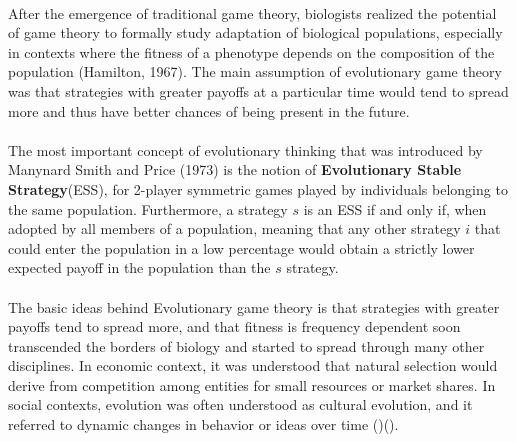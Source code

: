 \paragraph{}After the emergence of traditional game theory, biologists realized the potential of game theory to formally study adaptation of biological populations, especially in contexts where the fitness of a phenotype depends on the composition of the population (Hamilton, 1967). The main assumption of evolutionary game theory was that strategies with greater payoffs at a particular time would tend to spread more and thus have better chances of being present in the future.
\paragraph{}The most important concept of evolutionary thinking that was introduced by Manynard Smith and Price (1973) is the notion of \textbf{Evolutionary Stable Strategy}(ESS), for 2-player symmetric games played by individuals belonging to the same population. Furthermore, a strategy $s$ is an ESS if and only if, when adopted by all members of a population, meaning that any other strategy $i$ that could enter the population in a low percentage would obtain a strictly  lower expected payoff in the population than the $s$ strategy.
\paragraph{}The basic ideas behind Evolutionary game theory is that strategies with greater payoffs tend to spread more, and that fitness is frequency dependent soon transcended the borders of biology and started to spread through many other disciplines. In economic context, it was understood that natural selection would derive from competition among entities for small resources or market shares. In social contexts, evolution was often understood as cultural evolution, and it referred to dynamic changes in behavior or ideas over time (\cite{Nelson and Winter, 1982})(\cite{Boyd and Richerson, 1985}).
